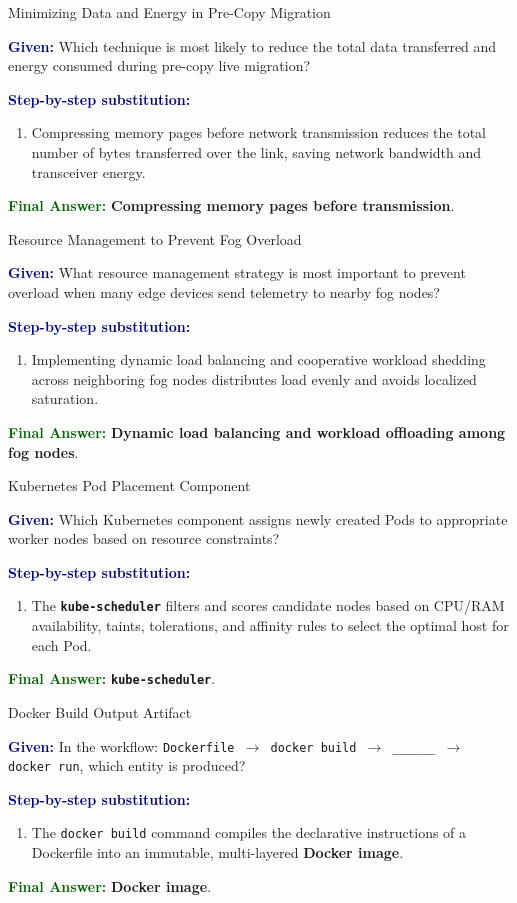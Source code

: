 \documentclass[11pt,a4paper,openany]{report}
\newcommand{\Given}{\par\textbf{\textcolor{navy}{Given:}} }
\newcommand{\Steps}{\par\textbf{\textcolor{navy}{Step-by-step substitution:}}\par}
\newcommand{\Answer}{\par\textbf{\textcolor{darkgreen}{Final Answer:}} }
\begin{document}
\begin{solved}{Minimizing Data and Energy in Pre-Copy Migration}
\Given Which technique is most likely to reduce the total data transferred and energy consumed during pre-copy live migration?
\Steps
\begin{enumerate}[leftmargin=*]
  \item Compressing memory pages before network transmission reduces the total number of bytes transferred over the link, saving network bandwidth and transceiver energy.
\end{enumerate}
\Answer \textbf{Compressing memory pages before transmission}.
\end{solved}

\begin{solved}{Resource Management to Prevent Fog Overload}
\Given What resource management strategy is most important to prevent overload when many edge devices send telemetry to nearby fog nodes?
\Steps
\begin{enumerate}[leftmargin=*]
  \item Implementing dynamic load balancing and cooperative workload shedding across neighboring fog nodes distributes load evenly and avoids localized saturation.
\end{enumerate}
\Answer \textbf{Dynamic load balancing and workload offloading among fog nodes}.
\end{solved}

\begin{solved}{Kubernetes Pod Placement Component}
\Given Which Kubernetes component assigns newly created Pods to appropriate worker nodes based on resource constraints?
\Steps
\begin{enumerate}[leftmargin=*]
  \item The \textbf{\texttt{kube-scheduler}} filters and scores candidate nodes based on CPU/RAM availability, taints, tolerations, and affinity rules to select the optimal host for each Pod.
\end{enumerate}
\Answer \textbf{\texttt{kube-scheduler}}.
\end{solved}

\begin{solved}{Docker Build Output Artifact}
\Given In the workflow: \texttt{Dockerfile $\to$ docker build $\to$ \_\_\_\_\_\_ $\to$ docker run}, which entity is produced?
\Steps
\begin{enumerate}[leftmargin=*]
  \item The \texttt{docker build} command compiles the declarative instructions of a Dockerfile into an immutable, multi-layered \textbf{Docker image}.
\end{enumerate}
\Answer \textbf{Docker image}.
\end{solved}
\end{document}
